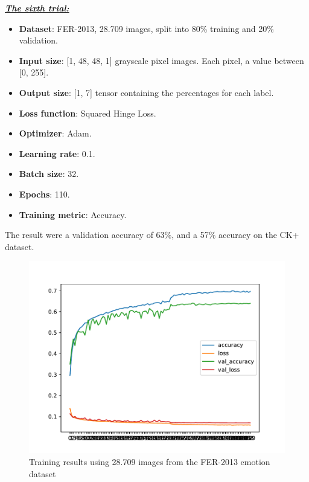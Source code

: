 \documentclass[runningheads,a4paper,11pt]{report}
\begin{document}
\clearpage
\underline{\textbf{\emph{The sixth trial:}}}
\begin{itemize}
	\item \textbf{Dataset}: FER-2013, 28.709 images, split into 80\% training and 20\% validation.
	\item \textbf{Input size}: [1, 48, 48, 1] grayscale pixel images. Each pixel, a value between [0, 255].
	\item \textbf{Output size}: [1, 7] tensor containing the percentages for each label.
	\item \textbf{Loss function}: Squared Hinge Loss.
	\item \textbf{Optimizer}: Adam.
	\item \textbf{Learning rate}: 0.1.
	\item \textbf{Batch size}: 32.
	\item \textbf{Epochs}: 110.
	\item \textbf{Training metric}: Accuracy.
\end{itemize}
The result were a validation accuracy of 63\%, and a 57\% accuracy on the CK+ dataset.
\begin{figure}[htbp]
\begin{center}
	\includegraphics[scale=0.8]{Fig/fer_training_28k_01_squared_hinge_loss.pdf}
	\caption{Training results using 28.709 images from the FER-2013 emotion dataset}
	\label{fer_training_28k_01_squared_hinge_loss}
\end{center}
\end{figure}
\end{document}

